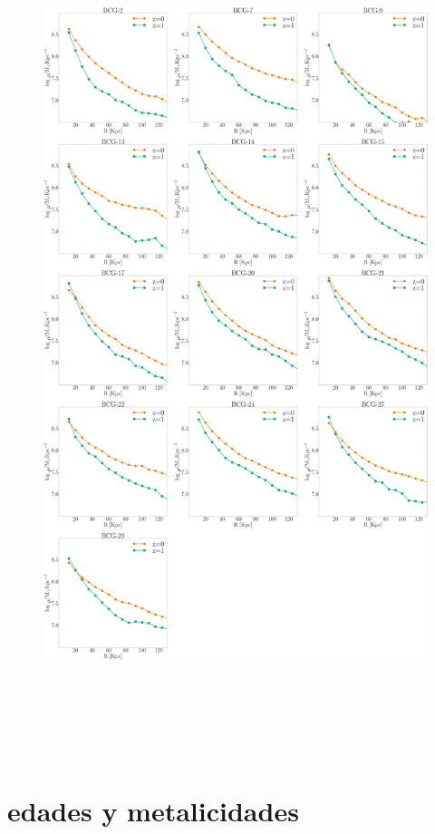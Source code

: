 \begin{figure}[H]
 \includegraphics[height=24.5cm, width=15cm]{../al_final/densidades/densidades.pdf}
\end{figure}



\section{edades y metalicidades}

